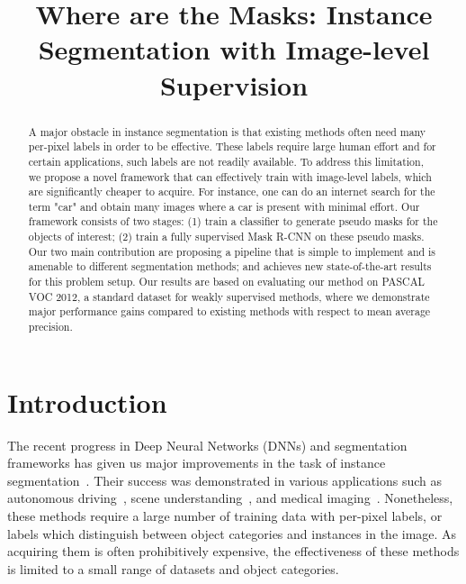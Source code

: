 \documentclass{bmvc2k}
\title{Where are the Masks: Instance Segmentation with Image-level Supervision}
\begin{document}
\maketitle

\begin{abstract}
A major obstacle in instance segmentation is that existing methods often need many per-pixel labels in order to be effective. These labels require large human effort and for certain applications, such labels are not readily available. To address this limitation, we propose a novel framework that can effectively train with image-level labels, which are significantly cheaper to acquire. For instance, one can do an internet search for the term "car" and obtain many images where a car is present with minimal effort. Our framework consists of two stages: (1) train a classifier to generate pseudo masks for the objects of interest; (2) train a fully supervised Mask R-CNN on these pseudo masks. Our two main contribution are proposing a pipeline that is simple to implement and is amenable to different segmentation methods; and achieves new state-of-the-art results for this problem setup. Our results are based on evaluating our method on PASCAL VOC 2012, a standard dataset for weakly supervised methods, where we demonstrate major performance gains compared to existing methods with respect to mean average precision.

\end{abstract}



\section{Introduction}
\label{sec:introduction}
The recent progress in Deep Neural Networks (DNNs) and segmentation frameworks has given us major improvements in the task of instance segmentation~\cite{he2017mask, chen2017masklab}. Their success was demonstrated in various applications such as autonomous driving~\cite{cordts2016cityscapes}, scene understanding~\cite{lin2014microsoft, everingham2010pascal}, and medical imaging~\cite{pohle2001segmentation, Konopczynski2018InstanceSO}. Nonetheless, these methods require  a large number of training data with per-pixel labels, or labels which distinguish between object categories and instances in the image. As acquiring them is often prohibitively expensive, the effectiveness of these methods is limited to a small range of datasets and object categories.
\end{document}
